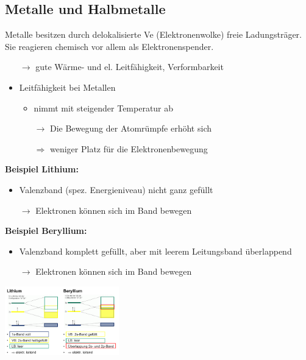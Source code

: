 \subsection{Metalle und Halbmetalle}
    Metalle besitzen durch delokalisierte Ve (Elektronenwolke) freie Ladungsträger.
    Sie reagieren chemisch vor allem als Elektronenspender.
    \begin{itemize}
        \item[$\rightarrow$] gute Wärme- und el. Leitfähigkeit, Verformbarkeit
        \item Leitfähigkeit bei Metallen
        \begin{itemize}
            \item nimmt mit steigender Temperatur ab
            
                $\rightarrow$ Die Bewegung der Atomrümpfe erhöht sich
                
                $\Rightarrow$ weniger Platz für die Elektronenbewegung
        \end{itemize}
    \end{itemize}
    \begin{minipage}{0.48\columnwidth}
        \textbf{Beispiel Lithium:}
            \begin{itemize}
                \item Valenzband (spez. Energieniveau) nicht ganz gefüllt
                
                    $\rightarrow$ Elektronen können sich im Band bewegen
            \end{itemize}
    \end{minipage}
    \hfill
    \begin{minipage}{0.48\columnwidth}
        \textbf{Beispiel Beryllium:}
            \begin{itemize}
                \item Valenzband komplett gefüllt, aber mit leerem Leitungsband überlappend
                
                    $\rightarrow$ Elektronen können sich im Band bewegen
            \end{itemize} 
    \end{minipage}
    \begin{center}
        \includegraphics[height=3cm]{pictures/Baender.png}
    \end{center}
